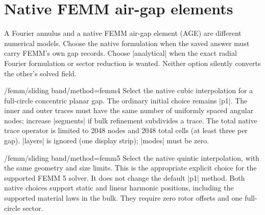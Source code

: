\section{Native FEMM air-gap elements}
\label{sec:native-gaps}

A Fourier annulus and a native FEMM air-gap element (AGE) are different numerical
models. Choose the native formulation when the saved answer must carry FEMM's
own gap records. Choose |analytical| when the exact radial Fourier formulation
or sector reduction is wanted. Neither option silently converts the other's
solved field.

\begin{key}{/femm/sliding band/method=femm4}
Select the native cubic interpolation for a full-circle concentric planar gap.
The ordinary initial choice remains |p1|. The inner and outer traces must have
the same number of uniformly spaced angular nodes; increase |segments| if bulk
refinement subdivides a trace. The total native trace operator is limited to
2048 nodes and 2048 total cells (at least three per gap). |layers| is ignored (one display strip); |modes| must be zero.
\end{key}
\begin{key}{/femm/sliding band/method=femm5}
Select the native quintic interpolation, with the same geometry and size limits.
This is the appropriate explicit choice for the supported FEMM 5 solver.
It does not change the default |p1| method. Both native choices support static
and linear harmonic positions, including the supported material laws in the
bulk. They require zero rotor offsets and one full-circle sector.
\end{key}

\begin{codeexample}[width=0pt]
\end{codeexample}

